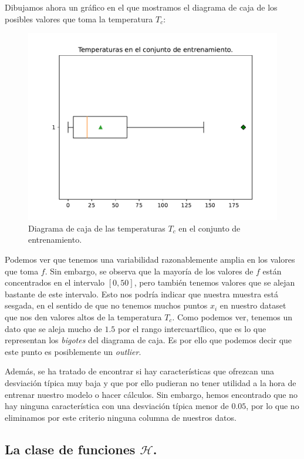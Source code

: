 \documentclass[a4paper, 20pt]{article}
\begin{document}
Dibujamos ahora un gráfico en el que mostramos el diagrama de caja de los posibles valores que toma la temperatura $T_c$:

\begin{figure}[H]
  \centering
  \includegraphics[scale = 0.4]{boxplot_y.pdf}
  \caption{Diagrama de caja de las temperaturas $T_c$ en el conjunto de entrenamiento.}
\end{figure}

Podemos ver que tenemos una variabilidad razonablemente amplia en los valores que toma $f$. Sin embargo, se observa que la mayoría de los valores de $f$ están concentrados en el intervalo $[0,50]$, pero también tenemos valores que se alejan bastante de este intervalo. Esto nos podría indicar que nuestra muestra está sesgada, en el sentido de que no tenemos muchos puntos $x_i$ en nuestro dataset que nos den valores altos de la temperatura $T_c$.  Como podemos ver, tenemos un dato que se aleja mucho de $1.5$ por el rango intercuartílico, que es lo que representan los \emph{bigotes} del diagrama de caja. Es por ello que podemos decir que este punto es posiblemente un \emph{outlier}.

Además, se ha tratado de encontrar si hay características que ofrezcan una desviación típica muy baja y que por ello pudieran no tener utilidad a la hora de entrenar nuestro modelo o hacer cálculos. Sin embargo, hemos encontrado que no hay ninguna característica con una desviación típica menor de $0.05$, por lo que no eliminamos por este criterio ninguna columna de nuestros datos.


\subsection{La clase de funciones $\mathcal H$. }
\end{document}
